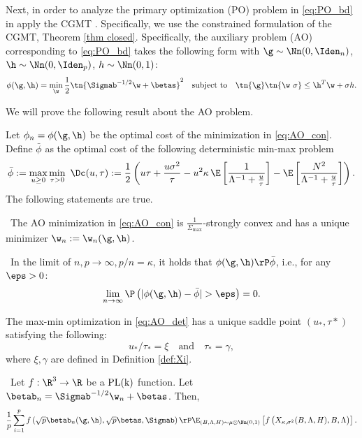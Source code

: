 Next, in order to analyze the primary optimization (PO) problem in \eqref{eq:PO_bd} in apply the CGMT \cite{thrampoulidis2015lasso}. Specifically, we use the constrained formulation of the CGMT, Theorem \ref{thm closed}.  Specifically, the auxiliary problem (AO) corresponding to \eqref{eq:PO_bd} takes the following form with $\g\sim\Nn(0,\Iden_n)$, $\h\sim\Nn(0,\Iden_p)$, $h\sim \Nn(0,1)$:%
\begin{align}
\phi(\g,\h) = \min_{\w} \frac{1}{2}\tn{\Sigmab^{-1/2}\w+\betas}^2\quad\text{subject to}\quad \tn{\g}\tn{\w~{\sigma}}\leq \h^T\w+\sigma h.\label{eq:AO_con}
\end{align}%

We will prove the following result about the AO problem.
\begin{lemma}\label{lem:AO}
Let $\phi_n=\phi(\g,\h)$ be the optimal cost of the minimization in \eqref{eq:AO_con}. Define $\bar\phi$ as the optimal cost of the following deterministic min-max problem
\begin{align}\label{eq:AO_det}
\bar\phi:=\max_{u\geq 0}\min_{\tau>0}~ \Dc(u,\tau):=\frac{1}{2}\left({u\tau} + \frac{u\sigma^2}{\tau} - u^2\kappa\,\E\left[ \frac{1}{\Lambda^{-1}+\frac{u}{\tau}} \right] - \E\left[\frac{N^2}{\Lambda^{-1}+\frac{u}{\tau}}\right] \right).
\end{align}
The following statements are true.

~The AO minimization in \eqref{eq:AO_con} is $\frac{1}{\Sigma_{\max}}$-strongly convex and has a unique minimizer $\w_n:=\w_n(\g,\h)$.

~In the limit of $n,p\rightarrow\infty, p/n=\kappa$, it holds that $\phi(\g,\h)\rP\bar\phi$, i.e., for any $\eps>0$:
$$
\lim_{n\rightarrow\infty}\P\left(|\phi(\g,\h)-\bar\phi|>\eps\right) = 0.
$$

 The max-min optimization in \eqref{eq:AO_det} has a unique saddle point $(u_*,\tau*)$ satisfying the following: 
$$
u_*/\tau_* = \xi\quad\text{and}\quad\tau_* = \gamma,
$$
where $\xi, \gamma$ are defined in Definition \ref{def:Xi}.


~Let $f:\R^3\rightarrow\R$ be a $\rm{PL}({k})$ function. Let $\betab_n=\Sigmab^{-1/2}\w_n + \betas$. Then,
$$
\frac{1}{p}\sum_{i=1}^{p}f\left(\sqrt{p}\betab_n(\g,\h),\sqrt{p}\betas,\Sigmab\right) \rP \E_{(B,\Lambda,H)\sim\mu\otimes	\Nn(0,1)}\left[f\left(X_{\kappa,\sigma^2}(B,\Lambda,H),B,\Lambda\right) \right].
$$


~



\end{lemma}




